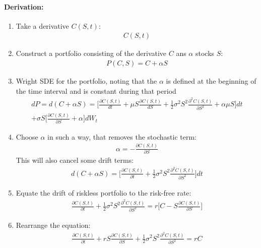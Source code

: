 \paragraph{Derivation:}
\begin{enumerate}
	\item Take a derivative $C(S, t)$:
	\begin{eqnarray}
	C(S, t)
	\end{eqnarray}
	\item Construct a portfolio consisting of the derivative $C$ ans $\alpha$ stocks $S$:
	\begin{eqnarray}
	P(C, S) = C + \alpha S
	\end{eqnarray}
	\item Wright SDE for the portfolio, noting that the $\alpha$ is defined at the beginning of the time interval and is constant during that period
	\begin{eqnarray}
	\nonumber
	dP = d(C + \alpha S) = \Big[\frac{\partial C(S, t)}{dt} + \mu S \frac{\partial C(S, t)}{dS} + \frac{1}{2}\sigma^{2}S^{2}\frac{\partial ^{2}C(S, t)}{\partial S^{2}} + \alpha\mu S\Big]dt \\+ \sigma S \Big[\frac{\partial C(S, t)}{\partial S} + \alpha\Big]dW_{t}
	\end{eqnarray}
	\item Choose $\alpha$ in such a way, that removes the stochastic term:
	\begin{eqnarray}
	\alpha = -\frac{\partial C(S, t)}{\partial S}
	\end{eqnarray}
	This will also cancel some drift terms:
	\begin{eqnarray}
	d(C + \alpha S) = \Big[\frac{\partial C(S, t)}{\partial t} + \frac{1}{2}\sigma^{2}S^{2}\frac{\partial ^{2}C(S, t)}{\partial S^{2}}\Big]dt
	\end{eqnarray}
	\item Equate the drift of riskless portfolio to the risk-free rate:
	\begin{eqnarray}
	\frac{\partial C(S, t)}{\partial t} + \frac{1}{2}\sigma^{2}S^{2}\frac{\partial ^{2}C(S, t)}{\partial S^{2}} = r\Big[C - S\frac{\partial C(S, t)}{\partial S}\Big]
	\end{eqnarray}
	\item Rearrange the equation:
	\begin{eqnarray}
	\frac{\partial C(S, t)}{\partial t} + rS\frac{\partial{C(S, t)}}{\partial S} + \frac{1}{2}\sigma^{2}S^{2}\frac{\partial ^{2}C(S, t)}{\partial S^{2}} = rC
	\end{eqnarray}
\end{enumerate}

